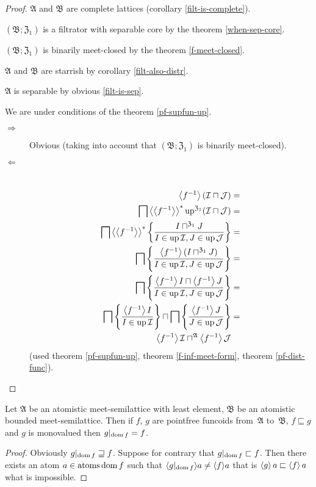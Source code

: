 \begin{proof}
$\mathfrak{A}$ and $\mathfrak{B}$ are complete lattices (corollary
\ref{filt-is-complete}).

$(\mathfrak{B};\mathfrak{Z}_{1})$ is a filtrator with separable core
by the theorem \ref{when-sep-core}.

$(\mathfrak{B};\mathfrak{Z}_{1})$ is binarily meet-closed by the
theorem \ref{f-meet-closed}.

$\mathfrak{A}$ and $\mathfrak{B}$ are starrish by corollary \ref{filt-also-distr}.

$\mathfrak{A}$ is separable by obvious \ref{filt-is-sep}.

We are under conditions of the theorem \ref{pf-supfun-up}.
\begin{description}
\item [{$\Rightarrow$}] Obvious (taking into account that $(\mathfrak{B};\mathfrak{Z}_{1})$
is binarily meet-closed).
\item [{$\Leftarrow$}] ~
\begin{align*}
\left\langle f^{-1}\right\rangle(\mathcal{I}\sqcap\mathcal{J}) & =\\
\bigsqcap\left\langle \left\langle f^{-1}\right\rangle\right\rangle ^{\ast}\operatorname{up}^{\mathfrak{Z}_{1}}(\mathcal{I}\sqcap\mathcal{J}) & =\\
\bigsqcap\left\langle \left\langle f^{-1}\right\rangle\right\rangle ^{\ast}\left\{ \frac{I\sqcap^{\mathfrak{Z}_{1}}J}{I\in\operatorname{up}\mathcal{I},J\in\operatorname{up}\mathcal{J}}\right\} & =\\
\bigsqcap\left\{ \frac{\left\langle f^{-1}\right\rangle(I\sqcap^{\mathfrak{Z}_{1}}J)}{I\in\operatorname{up}\mathcal{I},J\in\operatorname{up}\mathcal{J}}\right\} & =\\
\bigsqcap\left\{ \frac{\left\langle f^{-1}\right\rangle I\sqcap\left\langle f^{-1}\right\rangle J}{I\in\operatorname{up}\mathcal{I},J\in\operatorname{up}\mathcal{J}}\right\} & =\\
\bigsqcap\left\{ \frac{\left\langle f^{-1}\right\rangle I}{I\in\operatorname{up}\mathcal{I}}\right\}\sqcap\bigsqcap\left\{ \frac{\left\langle f^{-1}\right\rangle J}{J\in\operatorname{up}\mathcal{J}}\right\} & =\\
\left\langle f^{-1}\right\rangle\mathcal{I}\sqcap^{\mathfrak{A}}\left\langle f^{-1}\right\rangle\mathcal{J}
\end{align*}
(used theorem \ref{pf-supfun-up}, theorem \ref{f-inf-meet-form},
theorem \ref{pf-dist-func}).
\end{description}
\end{proof}
\begin{prop}
Let $\mathfrak{A}$ be an atomistic meet-semilattice with least element,
$\mathfrak{B}$ be an atomistic bounded meet-semilattice. Then if
$f$, $g$ are pointfree funcoids from~$\mathfrak{A}$ to~$\mathfrak{B}$,
$f\sqsubseteq g$ and $g$ is monovalued then $g|_{\operatorname{dom} f}=f$.\end{prop}
\begin{proof}
Obviously $g|_{\operatorname{dom} f}\sqsupseteq f$. Suppose for contrary that $g|_{\operatorname{dom} f}\sqsubset f$.
Then there exists an atom $a\in\operatorname{atoms}\operatorname{dom} f$ such that $\langle g|_{\operatorname{dom} f}\rangle a\neq\langle f\rangle a$
that is $\left\langle g\right\rangle a\sqsubset\left\langle f\right\rangle a$ what is impossible.
\end{proof}

